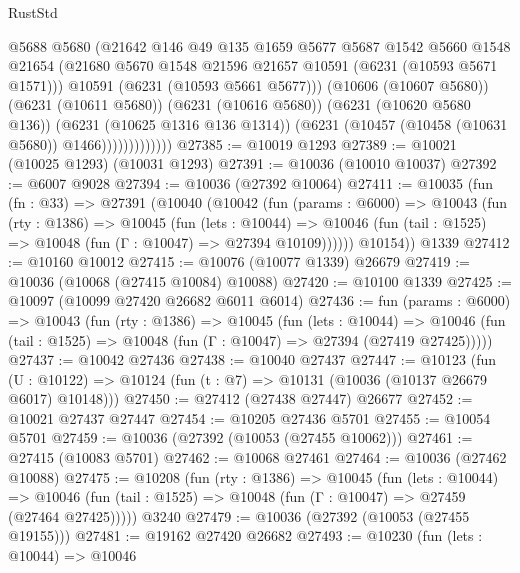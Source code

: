\begin{lexlean}{RustStd}
\begin{coremodule}
{{                          @5688
                          @5680
                          (@21642
                            @146
                            @49
                            @135
                            @1659
                            @5677
                            @5687
                            @1542
                            @5660
                            @1548
                            @21654
                            (@21680 @5670 @1548 @21596 @21657 @10591 (@6231 (@10593 @5671 @1571)))
                            @10591
                            (@6231 (@10593 @5661 @5677)))
                          (@10606 (@10607 @5680))
                          (@6231 (@10611 @5680))
                          (@6231 (@10616 @5680))
                          (@6231 (@10620 @5680 @136))
                          (@6231 (@10625 @1316 @136 @1314))
                          (@6231 (@10457 (@10458 (@10631 @5680)) @1466)))))))))))))
@27385 := @10019 @1293
@27389 := @10021 (@10025 @1293) (@10031 @1293)
@27391 := @10036 (@10010 @10037)
@27392 := @6007 @9028
@27394 := @10036 (@27392 @10064)
@27411 := @10035
    (fun (fn : @33) =>
    @27391
      (@10040
        (@10042
          (fun (params : @6000) =>
          @10043
            (fun (rty : @1386) =>
            @10045
              (fun (lets : @10044) =>
              @10046 (fun (tail : @1525) => @10048 (fun (Γ : @10047) => @27394 @10109))))))
        @10154))
    @1339
@27412 := @10160 @10012
@27415 := @10076 (@10077 @1339) @26679
@27419 := @10036 (@10068 (@27415 @10084) @10088)
@27420 := @10100 @1339
@27425 := @10097 (@10099 @27420 @26682 @6011 @6014)
@27436 := fun (params : @6000) =>
  @10043
    (fun (rty : @1386) =>
    @10045
      (fun (lets : @10044) =>
      @10046 (fun (tail : @1525) => @10048 (fun (Γ : @10047) => @27394 (@27419 @27425)))))
@27437 := @10042 @27436
@27438 := @10040 @27437
@27447 := @10123
    (fun (U : @10122) => @10124 (fun (t : @7) => @10131 (@10036 (@10137 @26679 @6017) @10148)))
@27450 := @27412 (@27438 @27447) @26677
@27452 := @10021 @27437 @27447
@27454 := @10205 @27436 @5701
@27455 := @10054 @5701
@27459 := @10036 (@27392 (@10053 (@27455 @10062)))
@27461 := @27415 (@10083 @5701)
@27462 := @10068 @27461
@27464 := @10036 (@27462 @10088)
@27475 := @10208
    (fun (rty : @1386) =>
    @10045
      (fun (lets : @10044) =>
      @10046 (fun (tail : @1525) => @10048 (fun (Γ : @10047) => @27459 (@27464 @27425)))))
    @3240
@27479 := @10036 (@27392 (@10053 (@27455 @19155)))
@27481 := @19162 @27420 @26682
@27493 := @10230
    (fun (lets : @10044) =>
    @10046
}}
\end{coremodule}
\end{lexlean}

